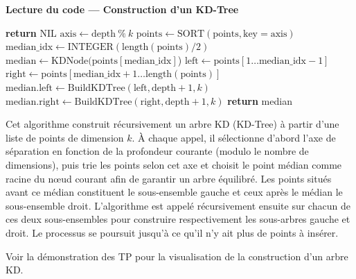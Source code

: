 \begin{Exercice}[5 minutes]\textbf{Lecture du code — Construction d'un KD-Tree}

\begin{algorithm}
\caption{BuildKDTree($\text{points}, \text{depth}, k$)}
\label{alg:kdtree-build}
\begin{algorithmic}[1]
    \State \textbf{return} $\text{NIL}$
\EndIf
\State $\text{axis} \leftarrow \text{depth} \ \% \ k$ 
\State $\text{points} \leftarrow \text{SORT}(\text{points}, \text{key} = \text{axis})$ 
\State $\text{median\_idx} \leftarrow \text{INTEGER}(\text{length}(\text{points}) / 2 )$ 
\State $\text{median} \leftarrow \text{KDNode}(\text{points}[\text{median\_idx}]$)
\State $\text{left} \leftarrow \text{points}[1 \ldots \text{median\_idx} - 1]$
\State $\text{right} \leftarrow \text{points}[\text{median\_idx} + 1 \ldots \text{length}(\text{points})]$
\State $\text{median.left} \leftarrow \text{BuildKDTree}(\text{left}, \text{depth} + 1, k)$
\State $\text{median.right} \leftarrow \text{BuildKDTree}(\text{right}, \text{depth} + 1, k)$
\State \textbf{return} median
\end{algorithmic}
\end{algorithm}

\begin{conseil}
Cet algorithme construit récursivement un arbre KD (KD-Tree) à partir d'une liste de points de dimension $k$. À chaque appel, il sélectionne d'abord l'axe de séparation en fonction de la profondeur courante (modulo le nombre de dimensions), puis trie les points selon cet axe et choisit le point médian comme racine du nœud courant afin de garantir un arbre équilibré. Les points situés avant ce médian constituent le sous-ensemble gauche et ceux après le médian le sous-ensemble droit. L'algorithme est appelé récursivement ensuite sur chacun de ces deux sous-ensembles pour construire respectivement les sous-arbres gauche et droit. Le processus se poursuit jusqu'à ce qu'il n'y ait plus de points à insérer.
\end{conseil}

\begin{solution}
Voir la démonstration des TP pour la visualisation de la construction d'un arbre KD.
\end{solution}

\end{Exercice}

